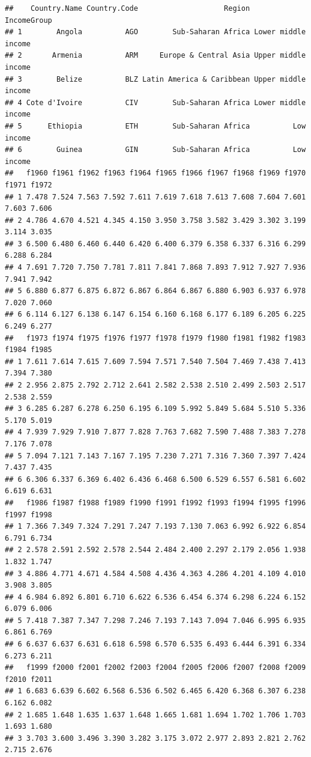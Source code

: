 \documentclass[
]{book}
\begin{document}
\begin{verbatim}
##    Country.Name Country.Code                    Region         IncomeGroup
## 1        Angola          AGO        Sub-Saharan Africa Lower middle income
## 2       Armenia          ARM     Europe & Central Asia Upper middle income
## 3        Belize          BLZ Latin America & Caribbean Upper middle income
## 4 Cote d'Ivoire          CIV        Sub-Saharan Africa Lower middle income
## 5      Ethiopia          ETH        Sub-Saharan Africa          Low income
## 6        Guinea          GIN        Sub-Saharan Africa          Low income
##   f1960 f1961 f1962 f1963 f1964 f1965 f1966 f1967 f1968 f1969 f1970 f1971 f1972
## 1 7.478 7.524 7.563 7.592 7.611 7.619 7.618 7.613 7.608 7.604 7.601 7.603 7.606
## 2 4.786 4.670 4.521 4.345 4.150 3.950 3.758 3.582 3.429 3.302 3.199 3.114 3.035
## 3 6.500 6.480 6.460 6.440 6.420 6.400 6.379 6.358 6.337 6.316 6.299 6.288 6.284
## 4 7.691 7.720 7.750 7.781 7.811 7.841 7.868 7.893 7.912 7.927 7.936 7.941 7.942
## 5 6.880 6.877 6.875 6.872 6.867 6.864 6.867 6.880 6.903 6.937 6.978 7.020 7.060
## 6 6.114 6.127 6.138 6.147 6.154 6.160 6.168 6.177 6.189 6.205 6.225 6.249 6.277
##   f1973 f1974 f1975 f1976 f1977 f1978 f1979 f1980 f1981 f1982 f1983 f1984 f1985
## 1 7.611 7.614 7.615 7.609 7.594 7.571 7.540 7.504 7.469 7.438 7.413 7.394 7.380
## 2 2.956 2.875 2.792 2.712 2.641 2.582 2.538 2.510 2.499 2.503 2.517 2.538 2.559
## 3 6.285 6.287 6.278 6.250 6.195 6.109 5.992 5.849 5.684 5.510 5.336 5.170 5.019
## 4 7.939 7.929 7.910 7.877 7.828 7.763 7.682 7.590 7.488 7.383 7.278 7.176 7.078
## 5 7.094 7.121 7.143 7.167 7.195 7.230 7.271 7.316 7.360 7.397 7.424 7.437 7.435
## 6 6.306 6.337 6.369 6.402 6.436 6.468 6.500 6.529 6.557 6.581 6.602 6.619 6.631
##   f1986 f1987 f1988 f1989 f1990 f1991 f1992 f1993 f1994 f1995 f1996 f1997 f1998
## 1 7.366 7.349 7.324 7.291 7.247 7.193 7.130 7.063 6.992 6.922 6.854 6.791 6.734
## 2 2.578 2.591 2.592 2.578 2.544 2.484 2.400 2.297 2.179 2.056 1.938 1.832 1.747
## 3 4.886 4.771 4.671 4.584 4.508 4.436 4.363 4.286 4.201 4.109 4.010 3.908 3.805
## 4 6.984 6.892 6.801 6.710 6.622 6.536 6.454 6.374 6.298 6.224 6.152 6.079 6.006
## 5 7.418 7.387 7.347 7.298 7.246 7.193 7.143 7.094 7.046 6.995 6.935 6.861 6.769
## 6 6.637 6.637 6.631 6.618 6.598 6.570 6.535 6.493 6.444 6.391 6.334 6.273 6.211
##   f1999 f2000 f2001 f2002 f2003 f2004 f2005 f2006 f2007 f2008 f2009 f2010 f2011
## 1 6.683 6.639 6.602 6.568 6.536 6.502 6.465 6.420 6.368 6.307 6.238 6.162 6.082
## 2 1.685 1.648 1.635 1.637 1.648 1.665 1.681 1.694 1.702 1.706 1.703 1.693 1.680
## 3 3.703 3.600 3.496 3.390 3.282 3.175 3.072 2.977 2.893 2.821 2.762 2.715 2.676

\end{verbatim}
\end{document}
